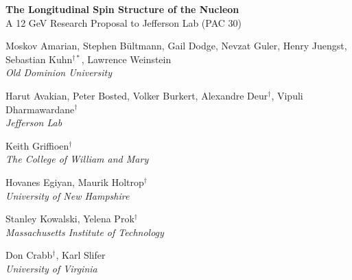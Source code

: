 \documentclass[12pt]{article}
\begin{document}
\pagestyle{plain}

\begin{titlepage}

{\center \large\bf The Longitudinal Spin Structure of the Nucleon\\}
{\center A 12 GeV Research Proposal to Jefferson Lab (PAC 30)\\}

\vspace*{9mm}


{\center Moskov Amarian, Stephen B\"ultmann, Gail Dodge, Nevzat Guler, 
Henry Juengst, Sebastian Kuhn$^{\dagger *}$,  
Lawrence Weinstein \\}
\vspace{-8pt}
{\center \small  \it  Old Dominion University \\}

{\center Harut Avakian, Peter Bosted, Volker Burkert, Alexandre Deur$^{\dagger}$, 
Vipuli Dharmawardane$^{\dagger}$\\}
\vspace{-8pt}
{\center \small \it  Jefferson Lab \\}

{\center Keith Griffioen$^{\dagger}$ \\}
\vspace{-8pt}
{\center \small \it  The College of William and Mary \\}

%
{\center Hovanes Egiyan,  Maurik Holtrop$^{\dagger}$ \\}
\vspace{-8pt}
{\center \small \it  University of New Hampshire \\}

{\center Stanley Kowalski, Yelena Prok$^{\dagger}$ \\}
\vspace{-8pt}
{\center \small \it Massachusetts Institute of Technology \\}

{\center Don Crabb$^{\dagger}$, Karl Slifer \\}
\vspace{-8pt}
{\center \small \it University of Virginia \\}


\end{titlepage}
\end{document}

